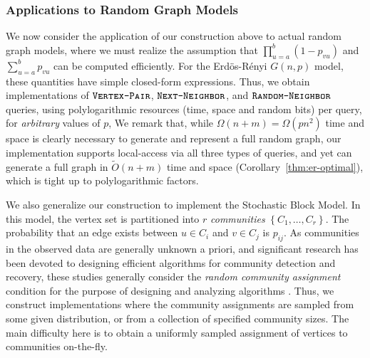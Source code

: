 \subsubsection{Applications to Random Graph Models}
\label{sec:applications_to_random_graph_models}
We now consider the application of our construction above to actual random graph models,
where we must realize the assumption that $\prod^{b}_{u=a} (1-p_{vu})$ and $\sum^{b}_{u=a} p_{vu}$ can be computed efficiently.
For the Erd\"{o}s-R\'{e}nyi $G(n,p)$ model, these quantities have simple closed-form expressions.
Thus, we obtain implementations of $\texttt{\textsc{Vertex-Pair}}$, $\texttt{\textsc{Next-Neighbor}}$, and $\texttt{\textsc{Random-Neighbor}}$ queries,
using polylogarithmic resources (time, space and random bits) per query, for \emph{arbitrary} values of $p$,
We remark that, while $\Omega(n+m) = \Omega(p n^2)$ time and space is clearly necessary to generate and represent a full random graph,
our implementation supports local-access via all three types of queries, and yet can generate a full graph in $\widetilde{O}(n+m)$ time and space
(Corollary~\ref{thm:er-optimal}), which is tight up to polylogarithmic factors.

We also generalize our construction to implement the Stochastic Block Model.
In this model, the vertex set is partitioned into $r$ \emph{communities} $\left\{ C_1, \ldots, C_r \right\}$.
The probability that an edge exists between $u\in C_i$ and $v \in C_j$ is $p_{ij}$.
As communities in the observed data are generally unknown a priori,
and significant research has been devoted to designing efficient algorithms for community detection and recovery, these studies generally consider
the \emph{random community assignment} condition for the purpose of designing and analyzing algorithms \cite{mossel2015reconstruction}.
Thus, we construct implementations where the community assignments are sampled from some given distribution,
or from a collection of specified community sizes.
The main difficulty here is to obtain a uniformly sampled assignment of vertices to communities on-the-fly.

